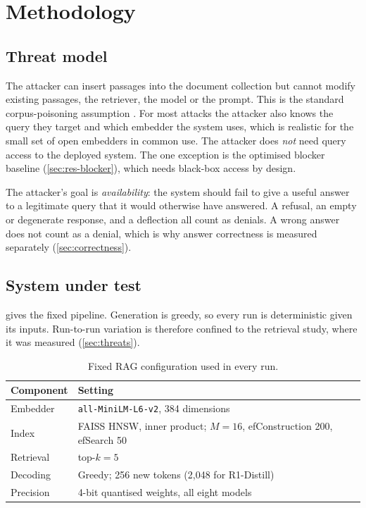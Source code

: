 \chapter{Methodology}
\label{ch:method}

\section{Threat model}
\label{sec:threat}

The attacker can insert passages into the document collection but cannot
modify existing passages, the retriever, the model or the prompt. This is the
standard corpus-poisoning assumption \cite{zou2025poisonedrag,zhong2023poisoning}.
For most attacks the attacker also knows the query they target and which
embedder the system uses, which is realistic for the small set of open
embedders in common use. The attacker does \emph{not} need query access to the
deployed system. The one exception is the optimised blocker baseline
(\cref{sec:res-blocker}), which needs black-box access by design.

The attacker's goal is \emph{availability}: the system should fail to give a
useful answer to a legitimate query that it would otherwise have answered. A
refusal, an empty or degenerate response, and a deflection all count as
denials. A wrong answer does not count as a denial, which is why answer
correctness is measured separately (\cref{sec:correctness}).

\section{System under test}
\label{sec:system}

 gives the fixed pipeline. Generation is greedy, so every run
is deterministic given its inputs. Run-to-run variation is therefore confined
to the retrieval study, where it was measured (\cref{sec:threats}).

\begin{table}[ht]
\centering
\small
\caption{Fixed RAG configuration used in every run.}
\label{tab:config}
\begin{tabular}{@{}ll@{}}
\toprule
Component & Setting \\
\midrule
Embedder  & \texttt{all-MiniLM-L6-v2}, 384 dimensions \cite{reimers2019sbert} \\
Index     & FAISS HNSW, inner product; $M=16$, efConstruction 200, efSearch 50 \\
Retrieval & top-$k = 5$ \\
Decoding  & Greedy; 256 new tokens (2{,}048 for R1-Distill) \\
Precision & 4-bit quantised weights, all eight models \cite{dettmers2023qlora} \\
\bottomrule
\end{tabular}
\end{table}


